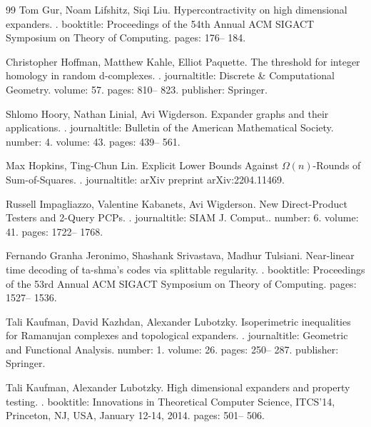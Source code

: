 \documentclass[10pt,a4paper]{article}
\theoremstyle{definition}
\theoremstyle{remark}
\numberwithin{equation}{section}
\begin{document}
\begin{thebibliography}{99}
Tom Gur, Noam Lifshitz, Siqi Liu.
\newblock Hypercontractivity on high dimensional expanders.
.
\newblock booktitle: Proceedings of the 54th Annual ACM SIGACT Symposium on Theory of Computing.
\newblock pages: 176-- 184.

Christopher Hoffman, Matthew Kahle, Elliot Paquette.
\newblock The threshold for integer homology in random d-complexes.
.
\newblock journaltitle: Discrete \& Computational Geometry.
\newblock volume: 57.
\newblock pages: 810-- 823.
\newblock publisher: Springer.

Shlomo Hoory, Nathan Linial, Avi Wigderson.
\newblock Expander graphs and their applications.
.
\newblock journaltitle: Bulletin of the American Mathematical Society.
\newblock number: 4.
\newblock volume: 43.
\newblock pages: 439-- 561.

Max Hopkins, Ting-Chun Lin.
\newblock Explicit Lower Bounds Against $\Omega(n)$-Rounds of Sum-of-Squares.
.
\newblock journaltitle: arXiv preprint arXiv:2204.11469.

Russell Impagliazzo, Valentine Kabanets, Avi Wigderson.
\newblock New Direct-Product Testers and 2-Query {PCP}s.
.
\newblock journaltitle: SIAM J. Comput..
\newblock number: 6.
\newblock volume: 41.
\newblock pages: 1722-- 1768.

Fernando Granha Jeronimo, Shashank Srivastava, Madhur Tulsiani.
\newblock Near-linear time decoding of ta-shma’s codes via splittable regularity.
.
\newblock booktitle: Proceedings of the 53rd Annual ACM SIGACT Symposium on Theory of Computing.
\newblock pages: 1527-- 1536.

Tali Kaufman, David Kazhdan, Alexander Lubotzky.
\newblock Isoperimetric inequalities for Ramanujan complexes and topological expanders.
.
\newblock journaltitle: Geometric and Functional Analysis.
\newblock number: 1.
\newblock volume: 26.
\newblock pages: 250-- 287.
\newblock publisher: Springer.

Tali Kaufman, Alexander Lubotzky.
\newblock High dimensional expanders and property testing.
.
\newblock booktitle: Innovations in Theoretical Computer Science, ITCS'14, Princeton, NJ, USA, January 12-14, 2014.
\newblock pages: 501-- 506.


\end{thebibliography}
\end{document}
